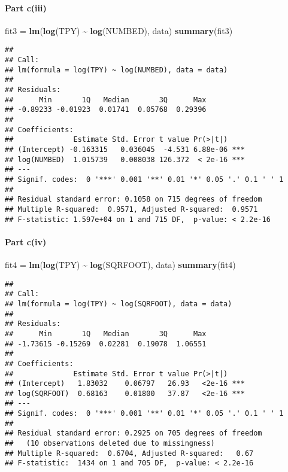 \documentclass[
]{article}
\newenvironment{Shaded}{\begin{snugshade}}{\end{snugshade}}
\newcommand{\FunctionTok}[1]{\textcolor[rgb]{0.13,0.29,0.53}{\textbf{#1}}}
\newcommand{\NormalTok}[1]{#1}
\newcommand{\OtherTok}[1]{\textcolor[rgb]{0.56,0.35,0.01}{#1}}
\newcommand{\SpecialCharTok}[1]{\textcolor[rgb]{0.81,0.36,0.00}{\textbf{#1}}}
\begin{document}
\hypertarget{part-ciii}{%
\paragraph{Part c(iii)}\label{part-ciii}}

\begin{Shaded}
\begin{Highlighting}[]
\NormalTok{fit3 }\OtherTok{=} \FunctionTok{lm}\NormalTok{(}\FunctionTok{log}\NormalTok{(TPY) }\SpecialCharTok{\textasciitilde{}} \FunctionTok{log}\NormalTok{(NUMBED), data)}
\FunctionTok{summary}\NormalTok{(fit3)}
\end{Highlighting}
\end{Shaded}

\begin{verbatim}
## 
## Call:
## lm(formula = log(TPY) ~ log(NUMBED), data = data)
## 
## Residuals:
##      Min       1Q   Median       3Q      Max 
## -0.89233 -0.01923  0.01741  0.05768  0.29396 
## 
## Coefficients:
##              Estimate Std. Error t value Pr(>|t|)    
## (Intercept) -0.163315   0.036045  -4.531 6.88e-06 ***
## log(NUMBED)  1.015739   0.008038 126.372  < 2e-16 ***
## ---
## Signif. codes:  0 '***' 0.001 '**' 0.01 '*' 0.05 '.' 0.1 ' ' 1
## 
## Residual standard error: 0.1058 on 715 degrees of freedom
## Multiple R-squared:  0.9571, Adjusted R-squared:  0.9571 
## F-statistic: 1.597e+04 on 1 and 715 DF,  p-value: < 2.2e-16
\end{verbatim}

\hypertarget{part-civ}{%
\paragraph{Part c(iv)}\label{part-civ}}

\begin{Shaded}
\begin{Highlighting}[]
\NormalTok{fit4 }\OtherTok{=} \FunctionTok{lm}\NormalTok{(}\FunctionTok{log}\NormalTok{(TPY) }\SpecialCharTok{\textasciitilde{}} \FunctionTok{log}\NormalTok{(SQRFOOT), data)}
\FunctionTok{summary}\NormalTok{(fit4)}
\end{Highlighting}
\end{Shaded}

\begin{verbatim}
## 
## Call:
## lm(formula = log(TPY) ~ log(SQRFOOT), data = data)
## 
## Residuals:
##      Min       1Q   Median       3Q      Max 
## -1.73615 -0.15269  0.02281  0.19078  1.06551 
## 
## Coefficients:
##              Estimate Std. Error t value Pr(>|t|)    
## (Intercept)   1.83032    0.06797   26.93   <2e-16 ***
## log(SQRFOOT)  0.68163    0.01800   37.87   <2e-16 ***
## ---
## Signif. codes:  0 '***' 0.001 '**' 0.01 '*' 0.05 '.' 0.1 ' ' 1
## 
## Residual standard error: 0.2925 on 705 degrees of freedom
##   (10 observations deleted due to missingness)
## Multiple R-squared:  0.6704, Adjusted R-squared:   0.67 
## F-statistic:  1434 on 1 and 705 DF,  p-value: < 2.2e-16
\end{verbatim}
\end{document}
